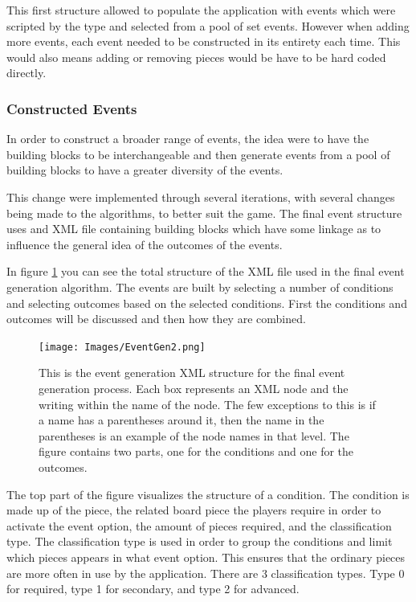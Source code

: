 This first structure allowed to populate the application with events which were scripted by the type and selected from a pool of set events. 
However when adding more events, each event needed to be constructed in its entirety each time. This would also means adding or removing pieces would be have to be hard coded directly. 

\subsubsection{Constructed Events}
In order to construct a broader range of events, the idea were to have the building blocks to be interchangeable and then generate events from a pool of building blocks to have a greater diversity of the events.

This change were implemented through several iterations, with several changes being made to the algorithms, to better suit the game. The final event structure uses and XML file containing building blocks which have some linkage as to influence the general idea of the outcomes of the events.

In figure \ref{fig:eGen2} you can see the total structure of the XML file used in the final event generation algorithm. 
The events are built by selecting a number of conditions and selecting outcomes based on the selected conditions. 
First the conditions and outcomes will be discussed and then how they are combined.

\begin{figure}[h]
    \centering
    \texttt{[image: Images/EventGen2.png]}
    \caption{This is the event generation XML structure for the final event generation process. Each box represents an XML node and the writing within the name of the node. The few exceptions to this is if a name has a parentheses around it, then the name in the parentheses is an example of the node names in that level. The figure contains two parts, one for the conditions and one for the outcomes.}
    \label{fig:eGen2}
\end{figure}

The top part of the figure visualizes the structure of a condition. The condition is made up of the piece, the related board piece the players require in order to activate the event option, the amount of pieces required, and the classification type.
The classification type is used in order to group the conditions and limit which pieces appears in what event option. This ensures that the ordinary pieces are more often in use by the application. There are 3 classification types. Type 0 for required, type 1 for secondary, and type 2 for advanced.

